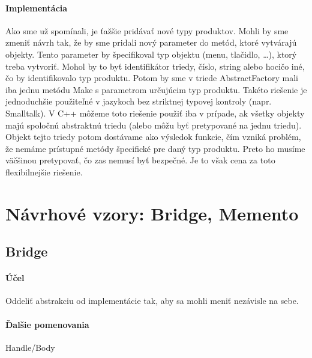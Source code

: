 		\paragraph{Implementácia}
			Ako sme už spomínali, je ťažšie pridávať nové typy produktov. Mohli by sme zmeniť návrh tak, že by sme pridali nový parameter do metód, ktoré vytvárajú objekty. Tento parameter by špecifikoval typ objektu (menu, tlačidlo, …), ktorý treba vytvoriť. Mohol by to byť identifikátor triedy, číslo, string alebo hocičo iné, čo by identifikovalo typ produktu. Potom by sme v triede AbstractFactory mali iba jednu metódu Make s parametrom určujúcim typ produktu. Takéto riešenie je jednoduchšie použiteľné v jazykoch bez striktnej typovej kontroly (napr. Smalltalk). V C++ môžeme toto riešenie použiť iba v prípade, ak všetky objekty majú spoločnú abstraktnú triedu (alebo môžu byť pretypované na jednu triedu). Objekt tejto triedy potom dostávame ako výsledok funkcie, čím vzniká problém, že nemáme prístupné metódy špecifické pre daný typ produktu. Preto ho musíme väčšinou pretypovať, čo zas nemusí byť bezpečné. Je to však cena za toto flexibilnejšie riešenie.

\section{Návrhové vzory: Bridge, Memento}


	\subsection{Bridge}
\paragraph{Účel}
Oddeliť abstrakciu od implementácie tak, aby sa mohli meniť nezávisle na sebe.

\paragraph{Ďalšie pomenovania}
Handle/Body

